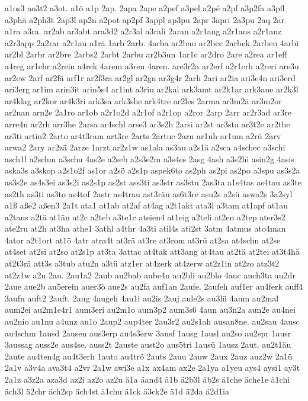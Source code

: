 {a1os3
ao3t2
a3ot.
a1ö
a1p
2ap.
2apa
2ape
a2pef
a3pel
a2pé
a2pf
a3p2fa
a3pfl
a3phä
a2ph3t
2ap3l
ap2n
a2pot
ap2pf
3appl
ap3pu
2apr
3apri
2a3pu
2aq
2ar.
a1ra
a3ra.
ar2ab
ar3abt
ara3d2
a2r3al
a3rali
2aran
a2r1ang
a2r1ans
a2r1anz
a2r3app
2a2rar
a2r1au
a1rä
1arb
2arb.
4arba
ar2bau
ar2bec
2arbek
2arben
4arbi
ar2bl
2arbr
ar2bre
2arbs2
2arbt
2arbu
ar2b3un
1ar1c
ar2dro
2are
a2rea
ar1eff
a4reg
ar1ehr
a2rein
a4rek
4arem
a3ren
4aren.
are3r2a
ar2erf
a2r1erh
a2reri
are3u
ar2ew
2arf
ar2fä
arf1r
ar2f3ra
ar2gl
ar2gn
ar3g4r
2arh
2ari
ar2ia
ari3e4n
ari3erd
ari3erg
ar1im
arin3it
arin5s4
ar1int
a3riu
ar2kal
ark3amt
ar2k1ar
ark3aue
ar2k3l
ar4klag
ar2kor
ar4k3ri
ark3sa
ark3she
ark4tre
ar2les
2arma
ar3m2ä
ar3m2or
ar2nan
arn2e
2a1ro
ar1ob
a2r1o2d
a2r1of
a2r1op
a2ror
2arp
2arr
ar2r3ad
ar3re
arre4n
ar2rh
arr3he
2arsa
ar4schl
arse3
ar3s2h
2arsi
ar2st
ar3sta
ar3t2e
ar2the
ar3ti
artin2
2arto
ar4t3ram
art3re
2arts
2artuc
2aru
ar1uh
ar1um
a2rü
2arv
arwa2
2ary
ar2zä
2arze
1arzt
ar2z1w
as1ala
as3au
a2s1ä
a2sca
a4schec
a3schi
asch1l
a2schm
a3schu
4as2e
a2seb
a2s3e2m
a3s4es
2asg
4ash
a3s2hi
asin2g
4asis
aska3s
a3skop
a2s1o2f
as1or
a2sö
a2s1p
aspek6to
as2ph
as2pi
as2po
a3spu
as3s2a
as3s2e
as4s3ei
as3s2i
as2s1p
as2st
ass3ti
as3str
as3stu
2as3ta
a1s4tas
as4tau
as3te
as2th
as3ti
as3to
as4tof
2astr
as4trau
ast3räu
as6t3re
asu2s
a2sü
aswa2s
3a2syl
a1ß
aße2
aßen3
2a1t
ata1
at1ab
at2af
at4ag
a2t1akt
ata3l
a3tam
at1apf
at1au
a2taus
a2tä
at1än
at2c
a2teb
a3te1c
ateien4
at1eig
a2teli
at2en
a2tep
ater3s2
ate2ru
at2h
at3ha
athe1
3athl
a4thr
4a3ti
atil4s
ati2st
3atm
4atmus
ato4man
4ator
a2t1ort
at1ö
4atr
atra4t
at3rä
at3re
at3rom
at3rü
at2sa
at4schn
at2se
at4set
at2si
at2so
at2s1p
at3ta
3attac
at4tak
att3ang
at4tau
at2tä
at2tei
at3t4hä
at2t3rä
att3s
a3tub
atu2n
a3tü
atz1er
at4zerk
at4zerw
at2z1in
at2zo
atz3t2
at2z1w
a2u
2au.
2au1a2
2aub
au2bab
aube4n
au2bli
au2blo
4auc
auch3ta
au2dr
2aue
aue2b
au5erein
auer3ö
aue2s
au2fa
auf1an
2aufe.
2aufeh
auf1er
au4ferk
auff4
3aufn
auft2
2auft.
2aug
4augeh
4au1i
au2is
2auj
aule2s
au3lü
4aum
au2mal
aum2ei
au2m1e4r1
aum3eri
au2m1o
aum3p2
aum3s6
4aun
au3n2a
aun2e
au4nei
au2nio
au1nu
a4unz
au1o
2aup2
aup4ter
2au3r2
au2s1ah
ausan8ne.
au2sau
4ausc
au4schm
1ausd
2ausen
aus3erp
au4s3erw
3ausf
1ausg
1ausl
au2so
au2spr
1ausr
3aussag
auss2e
aus4se.
auss2t
2auste
aust2o
aus5tri
1ausü
1ausz
2aut.
au2t1äu
2aute
au4ten4g
au4t3erh
1auto
au4trö
2auts
2auu
2auw
2aux
2auz
auz2w
2a1ü
2a1v
a3v4a
ava3t4
a2vr
2a1w
awi3e
a1x
ax4am
ax2e
2a1ya
a1yeu
ays4
aysi1
ay3t
2a1z
a3z2a
aza3d
az2i
az2o
az2u
ä1a
äand4
ä1b
ä2b3l
äb2s
ä1che
äche1e
ä1chi
äch3l
ä2chr
äch2sp
äch4st
ä1chu
ä1ck
ä3ck2e
ä1d
ä2da
ä2d1ia
}
